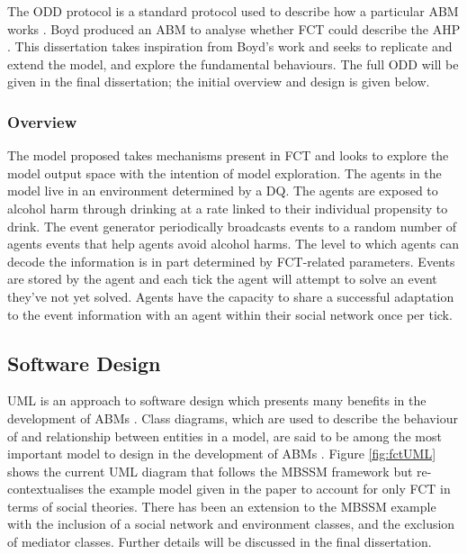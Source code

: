 The \ac{ODD} protocol is a standard protocol used to describe how a particular \ac{ABM} works \cite{oddOrigin}. Boyd produced an \ac{ABM} to analyse whether \ac{FCT} could describe the \ac{AHP} \cite{BoydphD}. This dissertation takes inspiration from Boyd's work and seeks to replicate and extend the model, and explore the fundamental behaviours. The full \ac{ODD} will be given in the final dissertation; the initial overview and design is given below.

\subsubsection{Overview}
The model proposed takes mechanisms present in \ac{FCT} and looks to explore the model output space with the intention of model exploration. The agents in the model live in an environment determined by a \ac{DQ}. The agents are exposed to alcohol harm through drinking at a rate linked to their individual propensity to drink. The event generator periodically broadcasts events to a random number of agents events that help agents avoid alcohol harms. The level to which agents can decode the information is in part determined by \ac{FCT}-related parameters. Events are stored by the agent and each tick the agent will attempt to solve an event they've not yet solved. Agents have the capacity to share a successful adaptation to the event information with an agent within their social network once per tick. 

\subsection{Software Design}
\ac{UML} is an approach to software design which presents many benefits in the development of \ac{ABM}s \cite{UMLABM}. Class diagrams, which are used to describe the behaviour of and relationship between entities in a model, are said to be among the most important model to design in the development of \ac{ABM}s \cite{UMLABM}. Figure \ref{fig:fctUML} shows the current \ac{UML} diagram that follows the \ac{MBSSM} framework but re-contextualises the example model given in the paper to account for only \ac{FCT} in terms of social theories. There has been an extension to the \ac{MBSSM} example with the inclusion of a social network and environment classes, and the exclusion of mediator classes. Further details will be discussed in the final dissertation.


